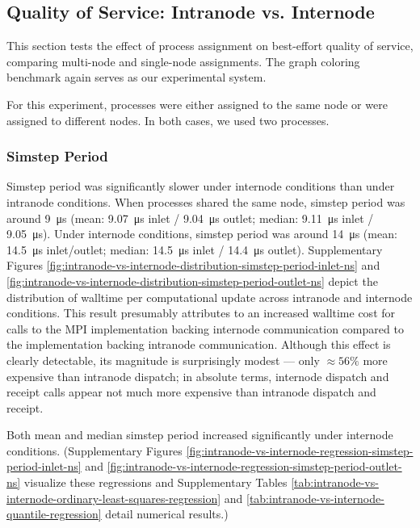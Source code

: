 \subsection{Quality of Service: Intranode vs. Internode}
\label{sec:intranode-vs-internode}

This section tests the effect of process assignment on best-effort quality of service, comparing multi-node and single-node assignments.
The graph coloring benchmark again serves as our experimental system.

For this experiment, processes were either assigned to the same node or were assigned to different nodes.
In both cases, we used two processes.

\subsubsection{Simstep Period}

Simstep period was significantly slower under internode conditions than under intranode conditions.
When processes shared the same node, simstep period was around \SI{9}{\micro\second} (mean: \SI{9.07}{\micro\second} inlet / \SI{9.04}{\micro\second} outlet; median: \SI{9.11}{\micro\second} inlet / \SI{9.05}{\micro\second}).
Under internode conditions, simstep period was around \SI{14}{\micro\second} (mean: \SI{14.5}{\micro\second} inlet/outlet; median: \SI{14.5}{\micro\second} inlet / \SI{14.4}{\micro\second} outlet).
Supplementary Figures \ref{fig:intranode-vs-internode-distribution-simstep-period-inlet-ns} and \ref{fig:intranode-vs-internode-distribution-simstep-period-outlet-ns} depict the distribution of walltime per computational update across intranode and internode conditions.
This result presumably attributes to an increased walltime cost for calls to the MPI implementation backing internode communication compared to the implementation backing intranode communication.
Although this effect is clearly detectable, its magnitude is surprisingly modest --- only $\approx 56\%$ more expensive than intranode dispatch;
in absolute terms, internode dispatch and receipt calls appear not much more expensive than intranode dispatch and receipt.

Both mean and median simstep period increased significantly under internode conditions.
(Supplementary Figures \ref{fig:intranode-vs-internode-regression-simstep-period-inlet-ns} and \ref{fig:intranode-vs-internode-regression-simstep-period-outlet-ns} visualize these regressions and Supplementary Tables \ref{tab:intranode-vs-internode-ordinary-least-squares-regression} and \ref{tab:intranode-vs-internode-quantile-regression} detail numerical results.)

